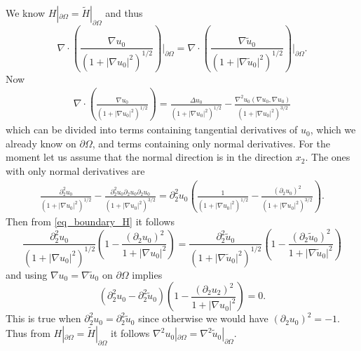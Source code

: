 \documentclass[a4paper, 10pt, twoside, notitlepage]{amsart}
\theoremstyle{plain}
\newcommand{\Om}{\Omega}
\numberwithin{equation}{section}
\newcommand {\p} {\partial}
\newcommand{\abs}[1]{\lvert #1 \rvert}
\begin{document}
We know $H|_{\p\Om}=\tilde H|_{\p\Om}$ and thus 
\begin{equation}\label{eq_boundary_H}
	\nabla\cdot\left(\frac{\nabla u_0}{(1+\abs{\nabla u_0}^2)^{1/2}}\right)\bigg|_{\p\Om} = 	\nabla\cdot\left(\frac{\nabla \tilde u_0}{(1+\abs{\nabla \tilde u_0}^2)^{1/2}}\right)\bigg|_{\p\Om}.
\end{equation}
Now
\begin{align*}
	\nabla\cdot\left(\frac{\nabla u_0}{(1+\abs{\nabla u_0}^2)^{1/2}}\right) = \frac{\Delta u_0}{(1+\abs{\nabla u_0}^2)^{1/2}} - \frac{\nabla^2u_0(\nabla u_0,\nabla u_0)}{(1+\abs{\nabla u_0}^2)^{3/2}}
\end{align*}
which can be divided into terms containing tangential derivatives of $u_0$, which we already know on $\p\Om$, and terms containing only normal derivatives. For the moment let us assume that the normal direction is in the direction $x_2$. The ones with only normal derivatives are
\begin{align*}
	\frac{\p^2_2u_0}{(1+\abs{\nabla u_0}^2)^{1/2}} - \frac{\p^2_2 u_0\p_2u_0\p_2u_0}{(1+\abs{\nabla u_0}^2)^{3/2}} = \p^2_2u_0\left(\frac{1}{(1+\abs{\nabla u_0}^2)^{1/2}} - \frac{(\p_2u_0)^2}{(1+\abs{\nabla u_0}^2)^{3/2}}\right).
\end{align*}
Then from \eqref{eq_boundary_H} it follows
\begin{equation*}
    \frac{\p^2_2u_0}{(1+\abs{\nabla u_0}^2)^{1/2}}\left(1-\frac{(\p_2u_0)^2}{1+\abs{\nabla u_0}^2}\right) = \frac{\p^2_2\tilde u_0}{(1+\abs{\nabla \tilde u_0}^2)^{1/2}}\left(1-\frac{(\p_2\tilde u_0)^2}{1+\abs{\nabla \tilde u_0}^2}\right)
\end{equation*}
and using $\nabla u_0=\nabla\tilde u_0$ on $\p\Om$ implies
\begin{equation*}
    \left(\p^2_2u_0 - \p^2_2\tilde u_0\right)\left(1-\frac{(\p_2u_2)^2}{1+\abs{\nabla u_0}^2}\right) = 0.
\end{equation*}
This is true when $\p^2_2u_0 = \p^2_2\tilde u_0$ since otherwise we would have $(\p_2u_0)^2=-1$.
Thus from $H|_{\p\Om}=\tilde H|_{\p\Om}$ it follows $\nabla^2 u_0|_{\p\Om} = \nabla^2\tilde u_0|_{\p\Om}$.
\end{document}
